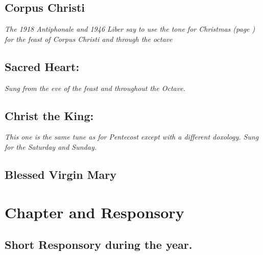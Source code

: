 \documentclass[a5paper,12pt,twoside,openany]{memoir}
\newcommand\rubrics[1]{\textit{#1}}
\begin{document}

\goodbreak

\section{Corpus Christi}

\rubrics{The 1918 Antiphonale and 1946 Liber say to use the tone for Christmas (page \pageref{TLchristmas}) for the feast of Corpus Christi and through the octave}

\section{Sacred Heart:}

\rubrics{Sung from the eve of the feast and throughout the Octave.}


\goodbreak


\section{Christ the King:}

\rubrics{This one is the same tune as for Pentecost except with a different doxology. Sung for the Saturday and Sunday.}


\section{Blessed Virgin Mary}




\chapter{Chapter and Responsory}


\section{Short Responsory during the year.}


\end{document}
